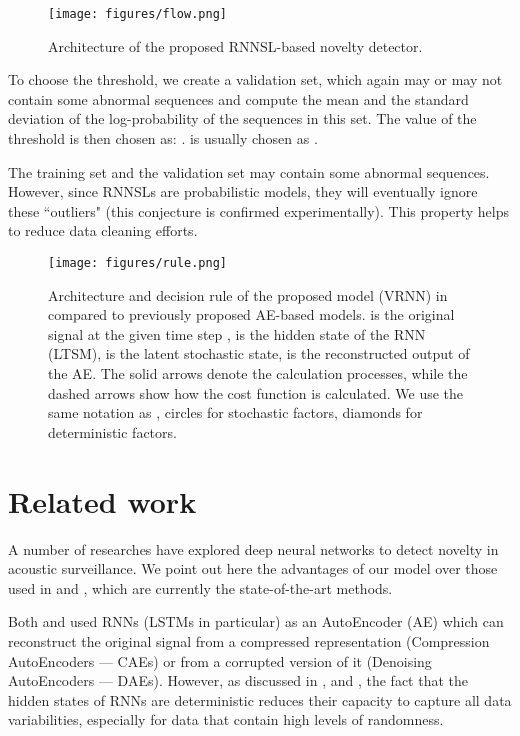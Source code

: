 \documentclass{article}
\begin{document}
\begin{figure}
  \centering
  \texttt{[image: figures/flow.png]}\caption{Architecture of the proposed RNNSL-based novelty detector.} \label{figArchitecture}
\end{figure}

To choose the threshold, we create a validation set, which again may or may not contain some abnormal sequences and compute the mean  and the standard deviation  of the log-probability of the sequences in this set. The value of the threshold is then chosen as: .
 is usually chosen as .  

The training set and the validation set may contain some abnormal sequences. However, since RNNSLs are probabilistic models, they will eventually ignore these ``outliers" (this conjecture is confirmed experimentally). This property helps to reduce data cleaning efforts.


\begin{figure}
  \centering
  \texttt{[image: figures/rule.png]}\caption{Architecture and decision rule of the proposed model (VRNN) in compared to previously proposed AE-based models.  is the original signal at the given time step ,  is the hidden state of the RNN (LTSM),  is the latent stochastic state,  is the reconstructed output of the AE. The solid arrows denote the calculation processes, while the dashed arrows show how the cost function is calculated. We use the same notation as \cite{fraccaro_sequential_2016}, circles for stochastic factors, diamonds for deterministic factors.} \label{figRule}
  \vspace{-4mm}
\end{figure} \section{Related work}
 \label{secRelatedWork}
 
A number of researches have explored deep neural networks to detect novelty in acoustic surveillance. We point out here the advantages of our model over those used in \cite{marchi_novel_2015} and \cite{principi_acoustic_2017}, which are currently the state-of-the-art methods. 

Both \cite{marchi_novel_2015} and \cite{principi_acoustic_2017} used RNNs (LSTMs in particular) as an AutoEncoder (AE) which can reconstruct the original signal from a compressed representation (Compression AutoEncoders --- CAEs) or from a corrupted version of it (Denoising AutoEncoders --- DAEs). However, as discussed in \cite{chung_recurrent_2015}, \cite{fraccaro_sequential_2016} and \cite{krishnan_deep_2017}, the fact that the hidden states of RNNs are deterministic reduces their capacity to capture all data variabilities, especially for data that contain high levels of randomness. 
\end{document}
